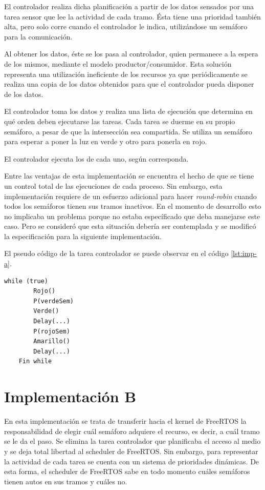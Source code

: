 El controlador realiza dicha planificación a partir de los datos sensados por una tarea sensor que lee la actividad de cada tramo.
Ésta tiene una prioridad también alta, pero solo corre cuando el controlador le indica, utilizándose un semáforo para la comunicación.

Al obtener los datos, éste se los pasa al controlador, quien permanece a la espera de los mismos, mediante el modelo productor/consumidor.
Esta solución representa una utilización ineficiente de los recursos ya que periódicamente se realiza una copia de los datos obtenidos para que el controlador pueda disponer de los datos.

El controlador toma los datos y realiza una lista de ejecución que determina en qué orden deben ejecutarse las tareas.
Cada tarea se duerme en su propio semáforo, a pesar de que la intersección sea compartida.
Se utiliza un semáforo para esperar a poner la luz en verde y otro para ponerla en rojo.

El controlador ejecuta los  de cada uno, según corresponda.

Entre las ventajas de esta implementación se encuentra el hecho de que se tiene un control total de las ejecuciones de cada proceso.
Sin embargo, esta implementación requiere de un esfuerzo adicional para hacer \emph{round-robin} cuando todos los semáforos tienen sus tramos inactivos. En el momento de desarrollo esto no implicaba un problema porque no estaba específicado que deba manejarse este caso. Pero se consideró que esta situación debería ser contemplada y se modificó la especificación para la siguiente implementación.

El pseudo código de la tarea controlador se puede observar en el código \ref{lst:imp-a}.

\begin{lstlisting}[float, label=lst:imp-a, caption=Pseudocódigo de la tarea controlador.]
	while (true)
		Rojo()
		P(verdeSem)
		Verde()
		Delay(...)
		P(rojoSem)
		Amarillo()
		Delay(...)
	Fin while
\end{lstlisting}



\section{Implementación B}

En esta implementación se trata de transferir hacia el kernel de FreeRTOS la responsabilidad de elegir cuál semáforo adquiere el recurso, es decir, a cuál tramo se le da el paso.
Se elimina la tarea controlador que planificaba el acceso al medio y se deja total libertad al scheduler de FreeRTOS.
Sin embargo, para representar la actividad de cada tarea se cuenta con un sistema de prioridades dinámicas.
De esta forma, el scheduler de FreeRTOS sabe en todo momento cuáles semáforos tienen autos en sus tramos y cuáles no.

